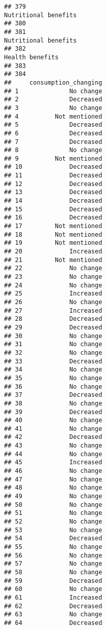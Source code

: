\documentclass[
]{article}
\begin{document}
\begin{verbatim}
## 379                                                                                                       Nutritional benefits
## 380                                                                                                                           
## 381                                                                                                       Nutritional benefits
## 382                                                                                                            Health benefits
## 383                                                                                                                           
## 384                                                                                                                           
##     consumption_changing
## 1              No change
## 2              Decreased
## 3              No change
## 4          Not mentioned
## 5              Decreased
## 6              Decreased
## 7              Decreased
## 8              No change
## 9          Not mentioned
## 10             Decreased
## 11             Decreased
## 12             Decreased
## 13             Decreased
## 14             Decreased
## 15             Decreased
## 16             Decreased
## 17         Not mentioned
## 18         Not mentioned
## 19         Not mentioned
## 20             Increased
## 21         Not mentioned
## 22             No change
## 23             No change
## 24             No change
## 25             Increased
## 26             No change
## 27             Increased
## 28             Decreased
## 29             Decreased
## 30             No change
## 31             No change
## 32             No change
## 33             Decreased
## 34             No change
## 35             No change
## 36             No change
## 37             Decreased
## 38             No change
## 39             Decreased
## 40             No change
## 41             No change
## 42             Decreased
## 43             No change
## 44             No change
## 45             Increased
## 46             No change
## 47             No change
## 48             No change
## 49             No change
## 50             No change
## 51             No change
## 52             No change
## 53             No change
## 54             Decreased
## 55             No change
## 56             No change
## 57             No change
## 58             No change
## 59             Decreased
## 60             No change
## 61             Increased
## 62             Decreased
## 63             No change
## 64             Decreased

\end{verbatim}
\end{document}

